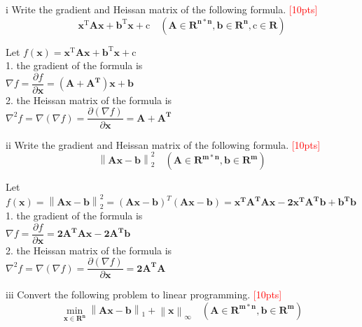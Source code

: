\begin{center}\begin{LARGE} \end{LARGE}\end{center}

\newpage
\begin{problem}{i}
Write the gradient and Heissan matrix of the following formula.
\textcolor{red}{[10pts]}$$\mathbf{x}^{\mathrm{T}}\mathbf{Ax}+\mathbf{b}^{\mathrm{T}}\mathbf{x}+\mathrm{c}\quad(\mathbf{A}\in\mathbf{R^{n*n}}, \mathbf{b}\in\mathbf{R^{n}}, \mathrm{c}\in\mathbf{R})$$
\end{problem}

    Let $f(\mathbf{x})=\mathbf{x}^{\mathrm{T}}\mathbf{Ax}+\mathbf{b}^{\mathrm{T}}\mathbf{x}+\mathrm{c}$\\
   
    1. the gradient of the formula is\\
    $\nabla f=\dfrac{\partial f}{\partial\mathbf{x}}=\mathbf{(A+A^T)x}+\mathbf{b}$\\

    2. the Heissan matrix of the formula is\\
    $\nabla^2 f=\nabla(\nabla f)=\dfrac{\partial(\nabla f)}{\partial\mathbf{x}}=\mathbf{A+A^T}$\\

\newpage
\begin{problem}{ii}
Write the gradient and Heissan matrix of the following formula.
\textcolor{red}{[10pts]}$$\left\|\mathbf{Ax}-\mathbf{b}\right\|^{2}_{2}\quad(\mathbf{A}\in\mathbf{R^{m*n}}, \mathbf{b}\in\mathbf{R^{m}})$$
\end{problem}

    Let $f(\mathbf{x})=\left\|\mathbf{Ax}-\mathbf{b}\right\|^{2}_{2}=(\mathbf{Ax}-\mathbf{b})^T(\mathbf{Ax}-\mathbf{b})=\mathbf{x^TA^TAx}-\mathbf{2x^TA^Tb}+\mathbf{b^Tb}$\\
    1. the gradient of the formula is\\
    $\nabla f=\dfrac{\partial f}{\partial\mathbf{x}}=\mathbf{2A^TAx}-\mathbf{2A^Tb}$\\

    2. the Heissan matrix of the formula is\\
    $\nabla^2 f=\nabla(\nabla f)=\dfrac{\partial(\nabla f)}{\partial\mathbf{x}}=\mathbf{2A^TA}$\\

\newpage    
\begin{problem}{iii}
Convert the following problem to linear programming.
\textcolor{red}{[10pts]}$$\min_{\mathbf{x}\in\mathbf{R^{n}}}\left\|\mathbf{Ax}-\mathbf{b}\right\|_{1}+\left\|\mathbf{x}\right\|_{\infty}\quad(\mathbf{A}\in\mathbf{R^{m*n}}, \mathbf{b}\in\mathbf{R^{m}})$$
\end{problem}

